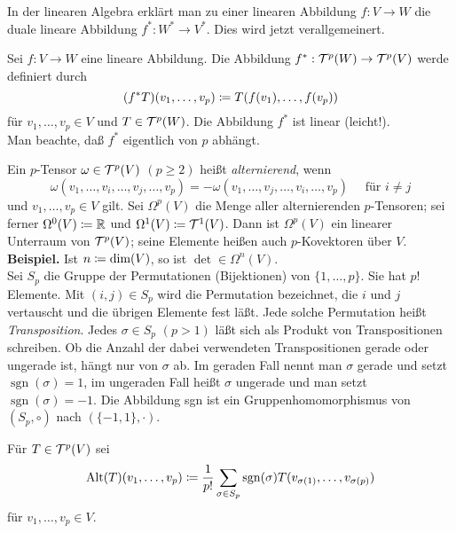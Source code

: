 \documentclass[a4paper,twoside,DIV15,BCOR12mm]{scrbook}
\DeclareMathOperator{\sgn}{sgn}
\begin{document}
\noindent
In der linearen Algebra erklärt man zu einer linearen Abbildung $f: 
V \to W$ die duale lineare Abbildung $f^{*}: W^{*} \to V^{*}$. Dies 
wird jetzt verallgemeinert.

\bigskip

 Sei $f: V \to W$ eine lineare Abbildung. 
Die Abbildung $f^{*}: {\cal T}^{p}(W) \to {\cal T}^{p}(V)$ werde 
definiert durch
\[ (f^{*}T)(v_{1},\dots,v_{p}) \da  T(f(v_{1}),\dots,f(v_{p})) \]
für $v_{1},\dots,v_{p} \in V$ und $T \in {\cal T}^{p}(W)$. Die 
Abbildung $f^{*}$ ist linear (leicht!).\\

\noindent
Man beachte, daß $f^{*}$ eigentlich von $p$ abhängt.\\

\bigskip

 Ein $p$-Tensor $\omega \in {\cal 
T}^{p}(V)$ $(p \ge 2)$ heißt {\em alternierend}, wenn
\[ \omega(v_{1},\dots,v_{i},\dots,v_{j},\dots,v_{p}) = 
-\omega(v_{1},\dots,v_{j},\dots,v_{i},\dots,v_{p}) \quad \mbox{ für } 
i \not= j \]
und $v_{1},\dots,v_{p} \in V$ gilt. Sei $\Omega^{p}(V)$ die Menge 
aller alternierenden $p$-Tensoren; sei ferner $\Omega^{0}(V) \da  
{\mathbb R}$ und $\Omega^{1}(V) \da  {\cal T}^{1}(V)$. Dann ist 
$\Omega^{p}(V)$ ein linearer Unterraum von ${\cal T}^{p}(V)$; seine 
Elemente heißen auch $p$-Kovektoren über $V$.\\

\noindent
{\bf Beispiel.} Ist $n\da \text{dim}(V)$, so ist $\det\in\Omega^n(V)$.\\

\noindent
Sei $S_{p}$ die Gruppe der Permutationen (Bijektionen) von 
$\{1,\dots,p\}$. Sie hat $p!$ Elemente. Mit $(i,j) \in S_{p}$ wird die 
Permutation bezeichnet, die $i$ und $j$ vertauscht und die übrigen 
Elemente fest läßt. Jede solche Permutation heißt {\em 
Transposition}. Jedes $\sigma \in S_{p}$ $(p > 1)$ läßt sich als 
Produkt von Transpositionen schreiben. Ob die Anzahl der dabei 
verwendeten Transpositionen gerade oder ungerade ist, hängt nur von 
$\sigma$ ab. Im geraden Fall nennt man $\sigma$ gerade und setzt $\sgn(\sigma) = 1$, im ungeraden Fall heißt $\sigma$ ungerade und man 
setzt $\sgn (\sigma) = -1$. Die Abbildung sgn ist ein 
Gruppenhomomorphismus von $(S_{p},\circ)$ nach $(\{-1,1\},\cdot)$.

\bigskip

 Für $T \in {\cal T}^{p}(V)$ sei
\[ {\rm Alt}(T)(v_{1},\dots,v_{p}) \da  \frac{1}{p!} \sum_{\sigma \in 
S_{p}} \sgn (\sigma) T(v_{\sigma(1)},\dots,v_{\sigma(p)}) \]
für $v_1,\ldots,v_p\in V$.\\
\end{document}
